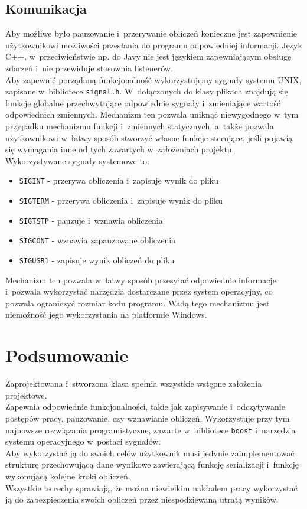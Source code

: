 \documentclass[a4paper]{article}
\begin{document}
\subsection{Komunikacja}
Aby możliwe było pauzowanie i~przerywanie obliczeń konieczne jest zapewnienie użytkownikowi możliwości przesłania do programu odpowiedniej informacji.
Język C++, w~przeciwieństwie np. do Javy nie jest językiem zapewniającym obsługę zdarzeń i~nie przewiduje stosownia listenerów.\\
Aby zapewnić porządaną funkcjonalność wykorzystujemy sygnały systemu UNIX, zapisane w~bibliotece \texttt{signal.h}.
W~dołączonych do klasy plikach znajdują się funkcje globalne przechwytujące odpowiednie sygnały i~zmieniające wartość odpowiednich zmiennych.
Mechanizm ten pozwala uniknąć niewygodnego w~tym przypadku mechanizmu funkcji i~zmiennych statycznych, a~także pozwala użytkownikowi w~łatwy sposób stworzyć własne funkcje sterujące, jeśli pojawią się wymagania inne od tych zawartych w~założeniach projektu.\\
Wykorzystywane sygnały systemowe to:
\begin{itemize}
\item \texttt{SIGINT} - przerywa obliczenia i~zapisuje wynik do pliku
\item \texttt{SIGTERM} - przerywa obliczenia i~zapisuje wynik do pliku
\item \texttt{SIGTSTP} - pauzuje i~wznawia obliczenia
\item \texttt{SIGCONT} - wznawia zapauzowane obliczenia
\item \texttt{SIGUSR1} - zapisuje wynik obliczeń do pliku
\end{itemize}
Mechanizm ten pozwala w~łatwy sposób przesyłać odpowiednie informacje i~pozwala wykorzystać narzędzia dostarczane przez system operacyjny, co pozwala ograniczyć rozmiar kodu programu.
Wadą tego mechanizmu jest niemożność jego wykorzystania na platformie Windows. 
\section{Podsumowanie}
Zaprojektowana i~stworzona klasa spełnia wszystkie wstępne założenia projektowe.\\
Zapewnia odpowiednie funkcjonalności, takie jak zapisywanie i~odczytywanie postępów pracy, pauzowanie, czy wznawianie obliczeń.
Wykorzystuje przy tym najnowsze rozwiązania programistyczne, zawarte w~bibliotece \texttt{boost} i~narzędzia systemu operacyjnego w~postaci sygnałów.\\
Aby wykorzystać ją do swoich celów użytkownik musi jedynie zaimplementować strukturę przechowującą dane wynikowe zawierającą funkcję serializacji i~funkcję wykonującą kolejne kroki obliczeń.\\
Wszystkie te cechy sprawiają, że można niewielkim nakładem pracy wykorzystać ją do zabezpieczenia swoich obliczeń przez niespodziewaną utratą wyników.
\end{document}
